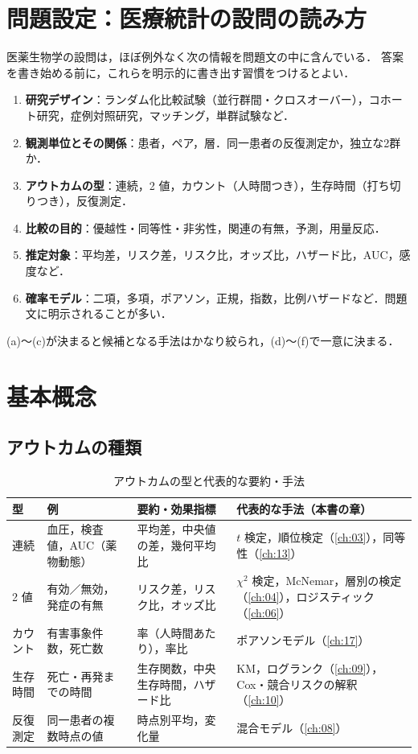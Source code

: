\section{問題設定：医療統計の設問の読み方}\label{sec:01-read}
医薬生物学の設問は，ほぼ例外なく次の情報を問題文の中に含んでいる．
答案を書き始める前に，これらを明示的に書き出す習慣をつけるとよい．
\begin{enumerate}[label=(\alph*)]
\item \textbf{研究デザイン}：ランダム化比較試験（並行群間・クロスオーバー），コホート研究，症例対照研究，マッチング，単群試験など．
\item \textbf{観測単位とその関係}：患者，ペア，層．同一患者の反復測定か，独立な2群か．
\item \textbf{アウトカムの型}：連続，2 値，カウント（人時間つき），生存時間（打ち切りつき），反復測定．
\item \textbf{比較の目的}：優越性・同等性・非劣性，関連の有無，予測，用量反応．
\item \textbf{推定対象}：平均差，リスク差，リスク比，オッズ比，ハザード比，AUC，感度など．
\item \textbf{確率モデル}：二項，多項，ポアソン，正規，指数，比例ハザードなど．問題文に明示されることが多い．
\end{enumerate}
(a)〜(c)が決まると候補となる手法はかなり絞られ，(d)〜(f)で一意に決まる．

\section{基本概念}\label{sec:01-basic}
\subsection{アウトカムの種類}\label{subsec:01-outcome}
\begin{table}[htbp]
\centering\small
\caption{アウトカムの型と代表的な要約・手法}\label{tab:01-outcome}
\begin{tabular}{@{}lL{35mm}L{35mm}L{45mm}@{}}
\toprule
型 & 例 & 要約・効果指標 & 代表的な手法（本書の章）\\
\midrule
連続 & 血圧，検査値，AUC（薬物動態） & 平均差，中央値の差，幾何平均比 & $t$ 検定，順位検定（\ref{ch:03}），同等性（\ref{ch:13}）\\
2 値 & 有効／無効，発症の有無 & リスク差，リスク比，オッズ比 & $\chi^2$ 検定，McNemar，層別の検定（\ref{ch:04}），ロジスティック（\ref{ch:06}）\\
カウント & 有害事象件数，死亡数 & 率（人時間あたり），率比 & ポアソンモデル（\ref{ch:17}）\\
生存時間 & 死亡・再発までの時間 & 生存関数，中央生存時間，ハザード比 & KM，ログランク（\ref{ch:09}），Cox・競合リスクの解釈（\ref{ch:10}）\\
反復測定 & 同一患者の複数時点の値 & 時点別平均，変化量 & 混合モデル（\ref{ch:08}）\\
\bottomrule
\end{tabular}
\end{table}

